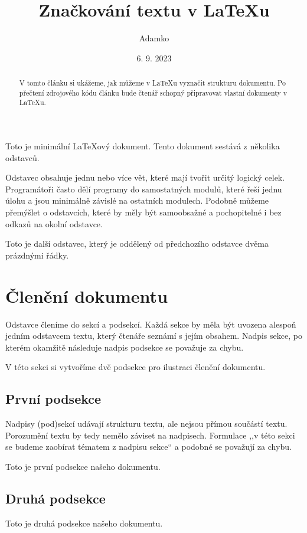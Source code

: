 \documentclass[a4paper]{article}
\title{Značkování textu v \LaTeX u}
\author{Adamko}
\date{6. 9. 2023}
\begin{document}
\maketitle

\begin{abstract}
V tomto článku si ukážeme, jak můžeme v \LaTeX u vyznačit strukturu dokumentu.
Po přečtení zdrojového kódu článku bude čtenář schopný připravovat vlastní
dokumenty v \LaTeX u.
\end{abstract}

Toto je minimální \LaTeX ový dokument. Tento dokument sestává z několika odstavců.

Odstavec obsahuje jednu nebo více vět, které mají tvořit určitý logický celek.
Programátoři často dělí programy do samostatných modulů, které řeší jednu úlohu
a jsou minimálně závislé na ostatních modulech. Podobně můžeme přemýšlet o odstavcích,
které by měly být samoobsažné a pochopitelné i bez odkazů na okolní odstavce.


Toto je další odstavec, který je oddělený od předchozího odstavce dvěma prázdnými řádky.

\tableofcontents

\section{Členění dokumentu}

Odstavce členíme do sekcí a podsekcí. Každá sekce by měla být uvozena alespoň jedním
odstavcem textu, který čtenáře seznámí s jejím obsahem. Nadpis sekce, po kterém okamžitě
následuje nadpis podsekce se považuje za chybu.

V této sekci si vytvoříme dvě podsekce pro ilustraci členění dokumentu.

\subsection{První podsekce}

Nadpisy (pod)sekcí udávají strukturu textu, ale nejsou přímou součástí textu.
Porozumění textu by tedy nemělo záviset na nadpisech. Formulace ,,v této sekci se
budeme zaobírat tématem z nadpisu sekce`` a podobné se považují za chybu.

Toto je první podsekce našeho dokumentu.

\subsection{Druhá podsekce}

Toto je druhá podsekce našeho dokumentu.
\end{document}
